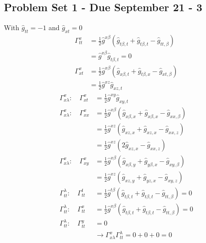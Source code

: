 \documentclass[../main.tex]{subfiles}
\begin{document}
\subsection{Problem Set 1 - Due September 21 - 3}
With $\hat{g}_{tt}=-1$ and $\hat{g}_{xt}=0$
\begin{align}
\Gamma^x_{tt}&=\frac{1}{2}\hat{g}^{x\beta}(\hat{g}_{t\beta,t}+\hat{g}_{t\beta,t}-\hat{g}_{tt,\beta})\\
&=\hat{g}^{x\beta}\hat{g}_{t\beta,t}=0\\
\Gamma^x_{xt}&=\frac{1}{2}\hat{g}^{x\beta}(\hat{g}_{x\beta,t}+\hat{g}_{t\beta,x}-\hat{g}_{xt,\beta})\\
&=\frac{1}{2}\hat{g}^{xz}\hat{g}_{xz,t}
\end{align}
\begin{align}
\Gamma^x_{x\lambda}:\quad\Gamma^x_{xt}&=\frac{1}{2}\hat{g}^{xy}\hat{g}_{xy,t}\\
\Gamma^x_{x\lambda}:\quad\Gamma^x_{xx}&=\frac{1}{2}\hat{g}^{x\beta}(\hat{g}_{x\beta,x}+\hat{g}_{x\beta,x}-\hat{g}_{xx,\beta})\\
&=\frac{1}{2}\hat{g}^{xz}(\hat{g}_{xz,x}+\hat{g}_{xz,x}-\hat{g}_{xx,z})\\
&=\frac{1}{2}\hat{g}^{xz}(2\hat{g}_{xz,x}-\hat{g}_{xx,z})\\
\Gamma^x_{x\lambda}:\quad\Gamma^x_{xy}
&=\frac{1}{2}\hat{g}^{x\beta}(\hat{g}_{x\beta,y}+\hat{g}_{y\beta,x}-\hat{g}_{xy,\beta})\\
&=\frac{1}{2}\hat{g}^{xz}(\hat{g}_{xz,y}+\hat{g}_{yz,x}-\hat{g}_{xy,z})\\
\Gamma^\lambda_{tt}:\quad\Gamma^t_{tt}
&=\frac{1}{2}\hat{g}^{t\beta}(\hat{g}_{t\beta,t}+\hat{g}_{t\beta,t}-\hat{g}_{tt,\beta})=0\\
\Gamma^\lambda_{tt}:\quad\Gamma^x_{tt}
&=\frac{1}{2}\hat{g}^{x\beta}(\hat{g}_{t\beta,t}+\hat{g}_{t\beta,t}-\hat{g}_{tt,\beta})=0\\
\Gamma^\lambda_{tt}:\quad\Gamma^y_{tt}&=0\\
&\rightarrow \Gamma^x_{x\lambda}\Gamma^\lambda_{tt}=0+0+0=0
\end{align}
\end{document}
